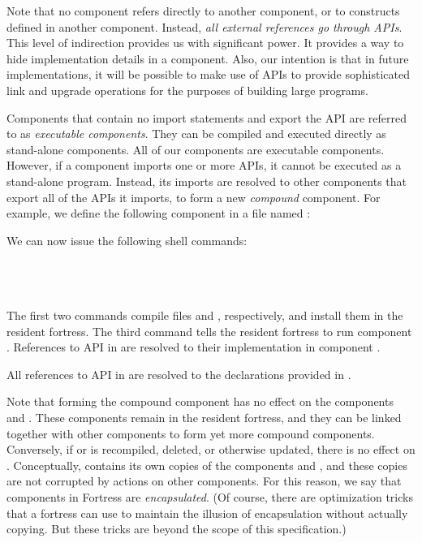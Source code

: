 Note that no component refers directly to another component,
or to constructs defined in another component.
Instead, \emph{all external references go through APIs}.
This level of indirection provides us with significant power.
It provides a way to hide implementation details in a component.
Also, our intention is that in future implementations,
it will be possible to make use of APIs to provide sophisticated
link and upgrade operations for the purposes of building
large programs.

Components that contain no import statements and export the API
 are referred to as \emph{executable components}. They
can be compiled and executed directly as stand-alone components. All
of our  components are executable components.
However,
if a component imports one or more APIs, it cannot be executed as a
stand-alone program. Instead, its imports are resolved to
other components that export all of the APIs it imports,
to form a new \emph{compound} component. For example, we define
the following component in a file named :
%

We can now issue the following shell commands:

 \\
 \\
 \\

The first two commands compile files  and
,
respectively, and install them in the resident fortress. The third
command tells the resident fortress to run component .
References to API  in  are resolved to their
implementation in component .

All references to API  in  are resolved
to the declarations provided in .

Note that forming the compound component  has no effect on the
components  and .
These components remain in the resident
fortress, and they can be linked together with other components to
form yet more compound components.
Conversely, if  or  is
recompiled, deleted, or otherwise updated,
there is no effect on .
Conceptually,  contains its own copies
of the components  and ,
and these copies are not corrupted by actions on other components.
For this reason, we say that components in Fortress
are \emph{encapsulated}. (Of course, there are optimization tricks
that a fortress can use to maintain the illusion of encapsulation
without actually copying. But these tricks are beyond the scope of
this specification.)

